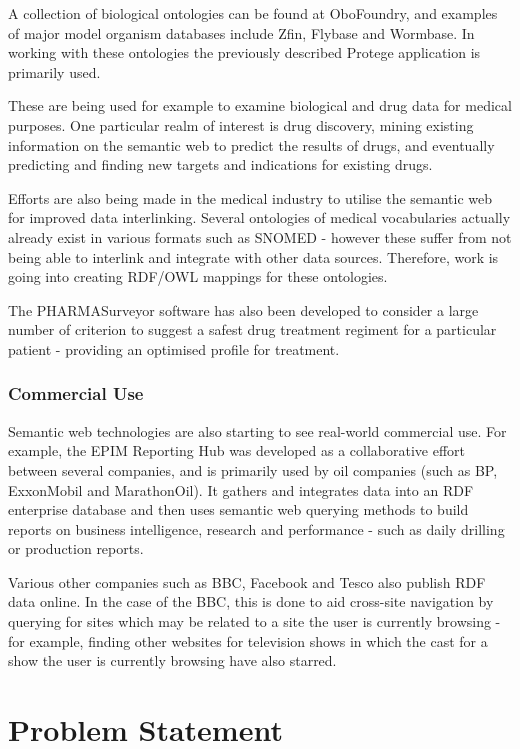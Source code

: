 \documentclass{article}
\begin{document}
A collection of biological ontologies can be found at
OboFoundry\cite{obofoundry}, and examples of major model organism databases
include Zfin\cite{zfin}, Flybase\cite{flybase} and Wormbase\cite{wormbase}. In working with
these ontologies the previously described Protege application is primarily used. 

These are being used for example to examine biological and drug data for medical
purposes\cite{humontology}. One particular realm of interest is drug discovery,
mining existing information on the semantic web to predict the results of drugs,
and eventually predicting and finding new targets and indications for existing
drugs\cite{semwebdiscovery}.

Efforts are also being made in the medical industry to utilise the semantic web
for improved data interlinking. Several ontologies of medical vocabularies actually
already exist in various formats such as SNOMED - however these suffer from not
being able to interlink and integrate with other data sources. Therefore, work
is going into creating RDF/OWL mappings for these ontologies. 

The PHARMASurveyor software has also been developed to consider a large number
of criterion to suggest a safest drug treatment regiment for a particular
patient - providing an optimised profile for treatment. 

\subsubsection{Commercial Use}

Semantic web technologies are also starting to see real-world commercial use.
For example, the EPIM Reporting Hub was developed as a collaborative effort
between several companies, and is primarily used by oil companies (such as BP,
ExxonMobil and MarathonOil). It gathers and integrates data into an RDF enterprise 
database and then uses semantic web querying methods to build reports on business 
intelligence, research and performance - such as daily drilling or production
reports.

Various other companies such as BBC, Facebook and Tesco also publish RDF data
online. In the case of the BBC, this is done to aid cross-site navigation by
querying for sites which may be related to a site the user is currently browsing
- for example, finding other websites for television shows in which the cast for
a show the user is currently browsing have also starred.

\section{Problem Statement}
\end{document}
